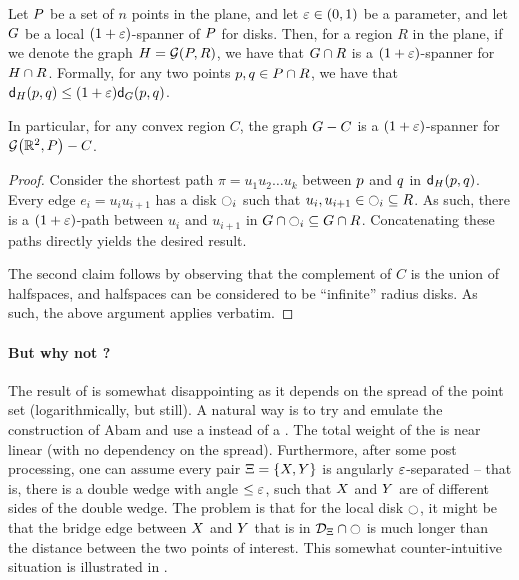 \documentclass[12pt]{article}%
\begin{document}
\begin{corollary}
    Let $P$ be a set of $n$ points in the plane, and let
    $\varepsilon \in (0,1)$ be a parameter, and let $G$ be a local
    $(1+\varepsilon)$-spanner of $P$ for disks. Then, for a region $R$ in the
    plane, if we denote the graph $\GA = \GY{\PS}{R}$, we have that
    $G \cap {R}$ is a $(1+\varepsilon)$-spanner for
    $H \cap {R}$. Formally, for any two points
    $p, q \in P \cap R$, we have that
    $\dGZ{\GA}{\pa}{\pb} \leq (1+\eps)\dGZ{\G}{\pa}{\pb}$.

    In particular, for any convex region $C$, the graph $G - C$
    is a $(1+\varepsilon)$-spanner for $\GY{\Re^2}{\PS} \gminus C$.
\end{corollary}
\begin{proof}
    Consider the shortest path $\pi = u_1 u_2 \ldots u_k$ between
    $p$ and $q$ in $\dGZ{\GA}{\pa}{\pb}$. Every edge
    $e_i = u_i u_{i+1}$ has a disk $\ocircle_i$ such that
    $u_i, u_{i+1} \in \ocircle_i \subseteq R$. As such, there is a
    $(1+\varepsilon)$-path between $u_i$ and $u_{i+1}$ in
    $G \cap {\ocircle_i} \subseteq
    G \cap {R}$. Concatenating these paths directly yields the
    desired result.

    The second claim follows by observing that the complement of $C$
    is the union of halfspaces, and halfspaces can be considered to be
    ``infinite'' radius disks. As such, the above argument applies
    verbatim.
\end{proof}

\paragraph{But why not \SSPD?}

The result of  is somewhat disappointing as it depends
on the spread of the point set (logarithmically, but still). A natural
way is to try and emulate the construction of Abam \etal
\cite{abfg-rftgs-09} and use a \SSPD instead of a \WSPD. The total weight
of the \SSPD is near linear (with no dependency on the
spread). Furthermore, after some post processing, one can assume every
pair $\Xi = \{ X, Y \}$ is angularly $\varepsilon$-separated -- that
is, there is a double wedge with angle $\leq \varepsilon$, such that $X$
and $Y$ are of different sides of the double wedge. The problem is
that for the local disk $\ocircle$, it might be that the bridge edge between
$X$ and $Y$ that is in $\mathcal{D}_\Xi \cap \ocircle$ is much longer
than the distance between the two points of interest. This somewhat counter-intuitive
situation is illustrated in .
\end{document}
